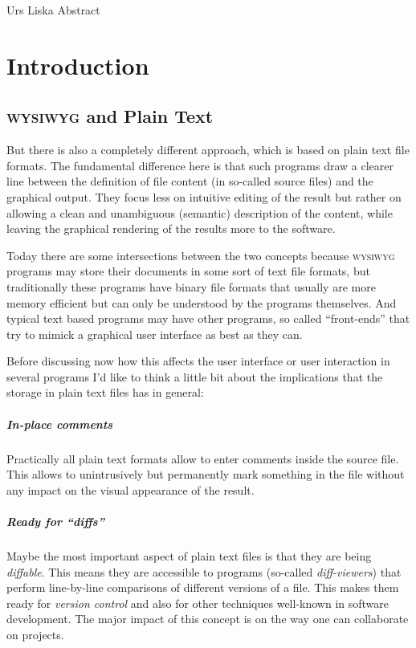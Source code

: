 \documentclass[../../LilyPond-Tutorials]{subfiles}
\begin{document}
\begin{authorAbstract}{Urs Liska}
Abstract
\end{authorAbstract}

\chapter{Introduction}


\section*{\textsc{wysiwyg} and Plain Text}

But there is also a completely different approach, which is based on plain text file formats.
The fundamental difference here is that such programs draw a clearer line between the definition of file content (in so-called source files) and the graphical output.
They focus less on intuitive editing of the result but rather on allowing a clean and unambiguous (semantic) description of the content, while leaving the graphical rendering of the results more to the software.

Today there are some intersections between the two concepts because \textsc{wysiwyg} programs may store their documents in some sort of text file formats, but traditionally these programs have binary file formats that usually are more memory efficient but can only be understood by the programs themselves.
And typical text based programs may have other programs, so called “front-ends” that try to mimick a graphical user interface as best as they can.

Before discussing now how this affects the user interface or user interaction in several programs I'd like to think a little bit about the implications that the storage in plain text files has in general:

\paragraph{In-place comments}
Practically all plain text formats allow to enter comments inside the source file.
This allows to unintrusively but permanently mark something in the file
without any impact on the visual appearance of the result.

\paragraph{Ready for “diffs”}
Maybe the most important aspect of plain text files is that they are being \emph{diffable}.
This means they are accessible to programs (so-called \emph{diff-viewers}) that perform line-by-line comparisons of different versions of a file.
This makes them ready for \emph{version control} and also for other techniques well-known in software development.
The major impact of this concept is on the way one can collaborate on projects.
\end{document}
